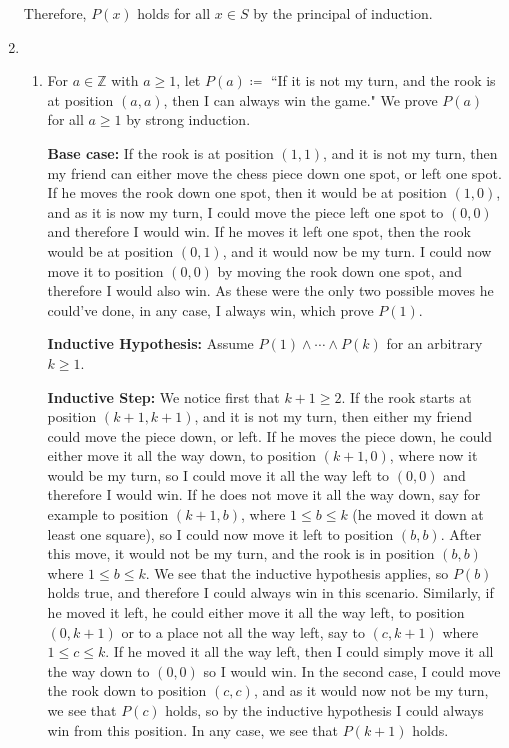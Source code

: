 \documentclass[12pt]{article}
\def\mbb#1{\mathbb{#1}}
\def\bZ{\mbb{Z}}
\theoremstyle{definition}
\theoremstyle{remark}
\begin{document}
\begin{enumerate}[leftmargin=\labelsep]
		Therefore, $P(x)$ holds for all $x \in S$ by the principal of induction. 
		
		\newpage
		\item
		\begin{enumerate}
			\item For $a \in \bZ$ with $a \geq 1$, let $P(a) \coloneq $ ``If it is not my turn, and the rook is at position $(a, a)$, then I can always win the game." We prove $P(a)$ for all $a \geq 1$ by strong induction.
		
			\textbf{Base case: } If the rook is at position $(1, 1)$, and it is not my turn, then my friend can either move the chess piece down one spot, or left one spot. If he moves the rook down one spot, then it would be at position $(1, 0)$, and as it is now my turn, I could move the piece left one spot to $(0, 0)$ and therefore I would win. If he moves it left one spot, then the rook would be at position $(0, 1)$, and it would now be my turn. I could now move it to position $(0, 0)$ by moving the rook down one spot, and therefore I would also win. As these were the only two possible moves he could've done, in any case, I always win, which prove $P(1)$.
			
			\textbf{Inductive Hypothesis: } Assume $P(1) \land \cdots \land P(k)$ for an arbitrary $k \geq 1$. 
			
			\textbf{Inductive Step: } We notice first that $k + 1 \geq 2$. If the rook starts at position $(k+1, k+1)$, and it is not my turn, then either my friend could move the piece down, or left. If he moves the piece down, he could either move it all the way down, to position $(k+1, 0)$, where now it would be my turn, so I could move it all the way left to $(0, 0)$ and therefore I would win. If he does not move it all the way down, say for example to position $(k+1, b)$, where $1 \leq b \leq k$ (he moved it down at least one square), so I could now move it left to position $(b, b)$. After this move, it would not be my turn, and the rook is in position $(b, b)$ where $1 \leq b \leq k$. We see that the inductive hypothesis applies, so $P(b)$ holds true, and therefore I could always win in this scenario. Similarly, if he moved it left, he could either move it all the way left, to position $(0, k+1)$ or to a place not all the way left, say to $(c, k+1)$ where $1 \leq c \leq k$. If he moved it all the way left, then I could simply move it all the way down to $(0, 0)$ so I would win. In the second case, I could move the rook down to position $(c, c)$, and as it would now not be my turn, we see that $P(c)$ holds, so by the inductive hypothesis I could always win from this position. In any case, we see that $P(k+1)$ holds.
			

\end{enumerate}
\end{enumerate}
\end{document}
